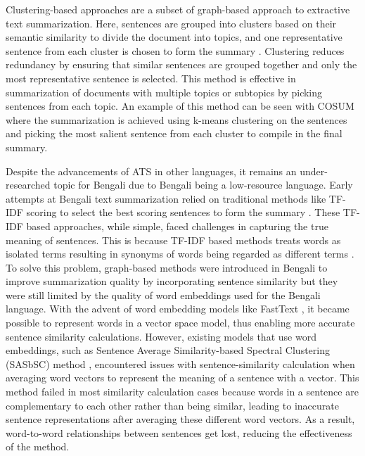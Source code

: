 \documentclass[acmlarge]{acmart}
\begin{document}
Clustering-based approaches are a subset of graph-based approach to extractive text summarization. Here, sentences are grouped into clusters based on their semantic similarity to divide the document into topics, and one representative sentence from each cluster is chosen to form the summary \cite{Mohan-2022-topic-modeling-rev-clustering}. Clustering reduces redundancy by ensuring that similar sentences are grouped together and only the most representative sentence is selected. This method is effective in summarization of documents with multiple topics or subtopics by picking sentences from each topic. An example of this method can be seen with COSUM \cite{alguliyev-2019-cosum} where the summarization is achieved using k-means clustering on the sentences and picking the most salient sentence from each cluster to compile in the final summary.

Despite the advancements of ATS in other languages, it remains an under-researched topic for Bengali due to Bengali being a low-resource language. Early attempts at Bengali text summarization relied on traditional methods like TF-IDF scoring to select the best scoring sentences to form the summary \cite{Akter-2017-tfidf-3, das-2022-tfidf, sarkar-2012-tfidf, sarkar-2012-tfidf-2}. These TF-IDF based approaches, while simple, faced challenges in capturing the true meaning of sentences. This is because TF-IDF based methods treats words as isolated terms resulting in synonyms of words being regarded as different terms \cite{tas-2017-rev-text-sum-2}. To solve this problem, graph-based methods were introduced in Bengali to improve summarization quality by incorporating sentence similarity but they were still limited by the quality of word embeddings used for the Bengali language. With the advent of word embedding models like FastText \cite{grave-etal-2018-fasttext}, it became possible to represent words in a vector space model, thus enabling more accurate sentence similarity calculations. However, existing models that use word embeddings, such as Sentence Average Similarity-based Spectral Clustering (SASbSC) method \cite{roychowdhury-etal-2022-spectral-base}, encountered issues with sentence-similarity calculation when averaging word vectors to represent the meaning of a sentence with a vector. This method failed in most similarity calculation cases because words in a sentence are complementary to each other rather than being similar, leading to inaccurate sentence representations after averaging these different word vectors. As a result, word-to-word relationships between sentences get lost, reducing the effectiveness of the method.
\end{document}
